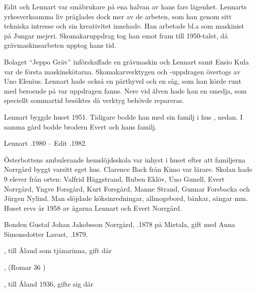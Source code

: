 Edit och Lennart var småbrukare på ena halvan av hans fars lägenhet. Lennarts yrkesverksamma liv präglades dock mer av de arbeten, som han genom sitt tekniska intresse och sin kreativitet innehade. Han arbetade bl.a som maskinist på Jungar mejeri. Skomakaruppdrag tog han emot fram till 1950-talet, då grävmaskinsarbeten upptog hans tid.

Bolaget ``Jeppo Gräv'' införskaffade en grävmaskin och Lennart samt Ensio Kula var de första maskinskötarna. Skomakarverktygen och -uppdragen övertogs av Uno Elenius. Lennart hade också en pärthyvel och en såg, som han körde runt med beroende på var uppdragen fanns. Nere vid älven hade han en smedja, som speciellt sommartid besöktes då verktyg behövde repareras.

Lennart byggde huset 1951. Tidigare bodde han med sin familj i hus , nedan. I samma gård bodde brodern Evert och hans familj.

Lennart .1980  --  Edit .1982.





Österbottens ambulerande hemslöjdsskola var inhyst i huset efter att familjerna Norrgård byggt varsitt eget hus. Clarence Back från Kimo var lärare. Skolan hade 9 elever från orten: Valfrid Häggstrand, Ruben Eklöv, Uno Gunell, Evert Norrgård, Yngve Forsgård, Kurt Forsgård, Manne Strand, Gunnar Forsbacka och Jürgen Nylind. Man slöjdade köksinredningar, allmogebord, bänkar, sängar mm. Huset revs år 1958 av ägarna Lennart och Evert Norrgård.



Bonden Gustaf Johan Jakobsson Norrgård, .1878 på Mietala, gift med Anna Simonsdotter Lavast, .1879.
\begin{jhchildren}
  \item {}, till Åland som tjänarinna, gift där
  \item {}
  \item {}
  \item {}
  \item {}, (Romar 36 )
  \item {}, till Åland 1936, gifte sig där
\end{jhchildren}

